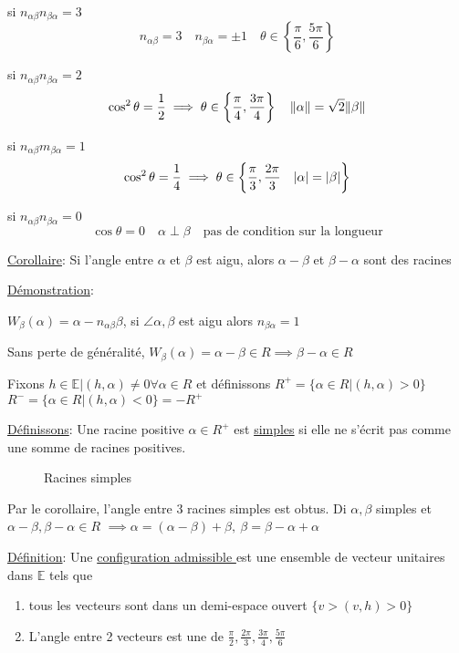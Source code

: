 si \(n_{\alpha\beta} n_{\beta\alpha} = 3\)
\[ n_{\alpha\beta} =3 \quad n_{\beta\alpha} = \pm 1 \quad \theta \in \left\{ \frac{\pi}{6}, \frac{5\pi}{6}  \right\}  \]

si \(n_{\alpha\beta} n_{\beta\alpha} = 2\)
\[ \cos^{2}\theta = \frac{1}{2} \implies \theta \in \left\{ \frac{\pi}{4} , \frac{3\pi}{4}  \right\} \quad \norm{\alpha} = \sqrt{2} \norm{\beta}   \]

si \(n_{\alpha\beta} m_{\beta\alpha} = 1\)
\[ \cos^2\theta = \frac{1}{4} \implies \theta \in \left\{ \frac{\pi}{3} , \frac{2\pi}{3} \quad \abs{\alpha} = \abs{\beta}   \right\}  \]

si \(n_{\alpha\beta} n_{\beta\alpha} =0\)
\[ \cos\theta = 0 \quad \alpha \perp \beta \quad \text{pas de condition sur la longueur}  \]


\underline{Corollaire}: Si l'angle entre \(\alpha \)  et \(\beta\) est aigu, alors \(\alpha-\beta \) et \(\beta-\alpha\) sont des racines

\underline{Démonstration}:

\(W_{\beta} (\alpha) = \alpha -n_{\alpha\beta} \beta \), si \(\angle \alpha,\beta \) est aigu alors \( n_{\beta\alpha} =1\)

Sans perte de généralité, \(W_{\beta} (\alpha) = \alpha - \beta \in R \implies \beta -\alpha \in R\)

Fixons \(h \in \mathds{E}| (h,\alpha) \neq 0 \forall \alpha \in R\) et définissons \(R^{+} = \{ \alpha \in R | (h,\alpha) > 0 \} \)
\(R^{-} = \{ \alpha \in R | (h,\alpha) < 0 \} = - R^{+} \)

\underline{Définissons}: Une racine positive \(\alpha \in R^{+}\) est \underline{simples} si elle ne s'écrit pas comme une somme de racines positives.  

\begin{figure}[ht]
    \centering
    \caption{Racines simples}
    \label{fig:racines-simples}
\end{figure}

Par le corollaire, l'angle entre 3 racines simples est obtus. Di \(\alpha,\beta\) simples et \(\alpha-\beta, \beta-\alpha \in R \)
\(\implies \alpha = \left( \alpha -\beta \right) + \beta, \ \beta = \beta-\alpha + \alpha  \) \lightning

\underline{Définition}: Une \underline{configuration admissible } est une ensemble de vecteur unitaires dans \(\mathds{E}\) tels que 

\begin{enumerate}
	\item tous les vecteurs sont dans un demi-espace ouvert \(\{ v> (v,h) > 0 \} \)
	\item L'angle entre 2 vecteurs est une de \(\frac{\pi}{2} , \frac{2\pi}{3} , \frac{3\pi}{4} , \frac{5\pi}{6}  \)

\end{enumerate}

